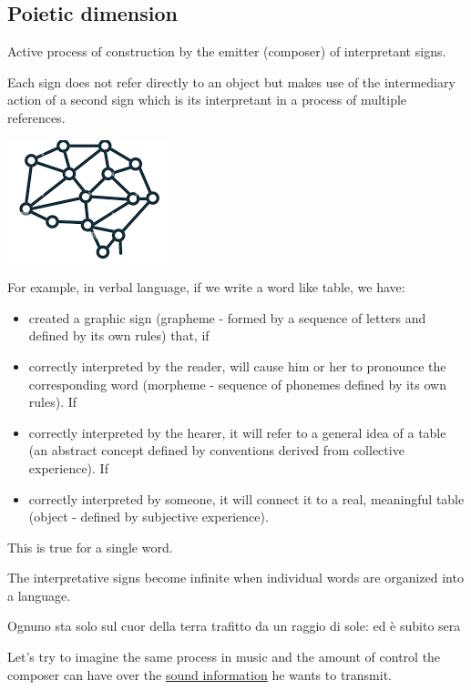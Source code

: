 \subsection{Poietic dimension}\label{poietic-dimension}

Active process of construction by the emitter (composer) of interpretant signs.

Each sign does not refer directly to an object but makes use of the intermediary action of a second sign which is its interpretant in a process of multiple references.

\begin{center}
\includegraphics[scale=0.45]{../img/rimandi.png}
\end{center}

For example, in verbal language, if we write a word like table, we have:

\begin{itemize}
\tightlist
\item created a graphic sign (grapheme - formed by a sequence of letters and defined by its own rules) that, if
\item correctly interpreted by the reader, will cause him or her to pronounce the corresponding word (morpheme - sequence of phonemes defined by its own rules). If
\item correctly interpreted by the hearer, it will refer to a general idea of a table (an abstract concept defined by conventions derived from collective experience). If
\item correctly interpreted by someone, it will connect it to a real, meaningful table (object - defined by subjective experience).
\end{itemize}

This is true for a single word.

The interpretative signs become infinite when individual words are organized into a language.

Ognuno sta solo sul cuor della terra trafitto da un raggio di sole: ed è subito sera

Let's try to imagine the same process in music and the amount of control the composer can have over the \href{https://github.com/musicaecodice/EMC/blob/main/1_premises/suoni/goldberg.mp3}{sound information} he wants to transmit.


